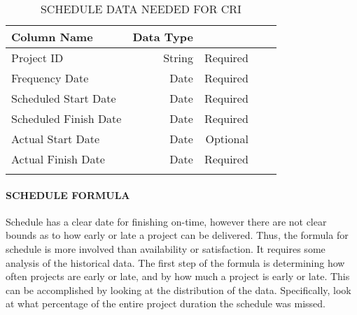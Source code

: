\documentclass[SDSUThesis.tex]{subfiles}
\begin{document}
                \begin{longtable}{@{}l rr rr}
                    \toprule%
                     \centering%
                     {\bfseries Column Name}
                     & {\bfseries Data Type}
                     &  \\
                    
                    \cmidrule[0.4pt](r{0.125em}){1-1}%
                    \cmidrule[0.4pt](lr{0.125em}){2-2}%
                    \cmidrule[0.4pt](l{0.125em}){3-3}%
                    \endhead
                    
                    Project ID & String  & Required \\
                    \myrowcolour%
                    Frequency Date & Date & Required \\
                    Scheduled Start Date & Date & Required \\
                    \myrowcolour%
                    Scheduled Finish Date & Date & Required \\
                    Actual Start Date & Date  & Optional \\
                    \myrowcolour%
                    Actual Finish Date & Date  & Required \\
                    
                    \bottomrule
                    
                    \caption{SCHEDULE DATA NEEDED FOR CRI}
                    \label{tab:scheduledata}
                \end{longtable}
                    
            \paragraph{SCHEDULE FORMULA}
                Schedule has a clear date for finishing on-time, however
                there are not clear bounds as to how early or late a project
                can be delivered.  Thus, the formula for schedule is more involved
                than availability or satisfaction.  It requires some analysis
                of the historical data.  The first step of the formula is
                determining how often projects are early or late, and by how
                much a project is early or late.  This can be accomplished
                by looking at the distribution of the data.  Specifically,
                look at what percentage of the entire project duration the
                schedule was missed.  
                
\end{document}
